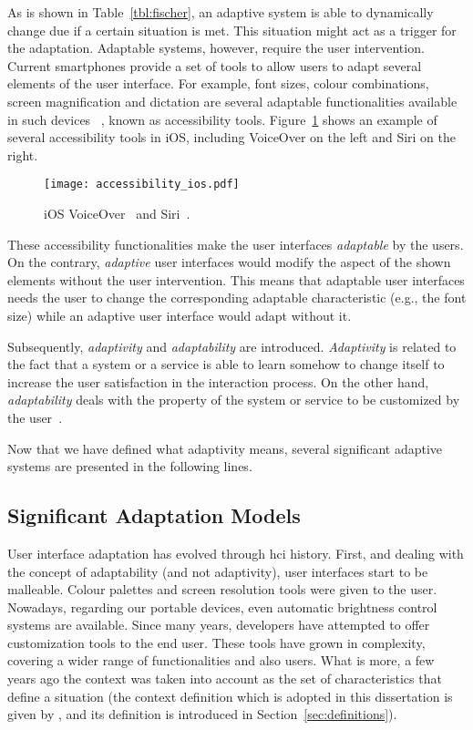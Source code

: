 As is shown in Table~\ref{tbl:fischer}, an adaptive system is able to dynamically 
change due if a certain situation is met. This situation might act as a trigger
for the adaptation. Adaptable systems, however, require the user intervention. 
Current smartphones provide a set of tools to allow users to adapt several 
elements of the user interface. For example, font sizes, colour combinations, 
screen magnification and dictation are several adaptable functionalities available 
in such devices ~\citep{android_accessibility}\citep{ios_accessibility},
known as accessibility tools. Figure~\ref{fig:accessibility_ios} shows an example 
of several accessibility tools in iOS, including VoiceOver on the left and Siri
on the right.

\begin{figure}
\centering
\texttt{[image: accessibility\_ios.pdf]}
\caption{iOS VoiceOver~\citep{ios_voiceover} and Siri~\citep{ios_siri}.}
\label{fig:accessibility_ios}
\end{figure}

These accessibility functionalities make the user interfaces \textit{adaptable}
by the users. On the contrary, \textit{adaptive} user interfaces would modify 
the aspect of the shown elements without the user intervention. This means that 
adaptable user interfaces needs the user to change the corresponding adaptable 
characteristic (e.g., the font size) while an adaptive user interface would 
adapt without it.

Subsequently, \textit{adaptivity} and \textit{adaptability} are introduced. 
\textit{Adaptivity} is related to the fact that a system or a service is able to 
learn somehow to change itself to increase the user satisfaction in the interaction 
process. On the other hand, \textit{adaptability} deals with the property of the 
system or service to be customized by the user~\citep{jameson_modelling_2001}.

Now that we have defined what adaptivity means, several significant adaptive 
systems are presented in the following lines.

\subsection{Significant Adaptation Models}
\label{sec:significant_adaptation_models}

User interface adaptation has evolved through \ac{hci} history. First, and 
dealing with the concept of adaptability (and not adaptivity), user interfaces 
start to be malleable. Colour palettes and screen resolution tools were given to 
the user. Nowadays, regarding our portable devices, even automatic brightness 
control systems are available. Since many years, developers have attempted to 
offer customization tools to the end user. These tools have grown in complexity, 
covering a wider range of functionalities and also users. What is more, a few 
years ago the context was taken into account as the set of characteristics that 
define a situation (the context definition which is adopted in this dissertation
is given by \citet{dey_understanding_2001}, and its definition is introduced
in Section~\ref{sec:definitions}).

